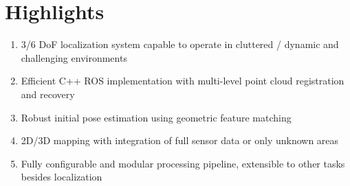 \section*{Highlights}

\begin{enumerate}
\item 3/6 DoF localization system capable to operate in cluttered / dynamic and challenging environments
\item Efficient C++ ROS implementation with multi-level point cloud registration and recovery
\item Robust initial pose estimation using geometric feature matching
\item 2D/3D mapping with integration of full sensor data or only unknown areas
\item Fully configurable and modular processing pipeline, extensible to other tasks besides localization
\end{enumerate}
